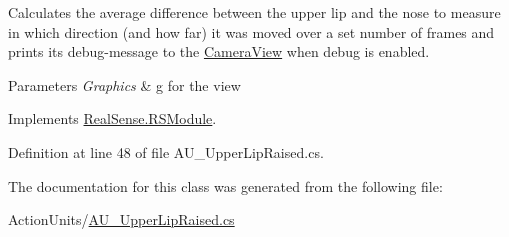 Calculates the average difference between the upper lip and the nose to measure in which direction (and how far) it was moved over a set number of frames and prints its\textquotesingle{} debug-\/message to the \hyperlink{class_real_sense_1_1_camera_view}{Camera\+View} when debug is enabled. 
\begin{DoxyParams}{Parameters}
{\em Graphics} & g for the view \\
\hline
\end{DoxyParams}


Implements \hyperlink{class_real_sense_1_1_r_s_module_a2ec830b7932ee7c0077d473f81c73867}{Real\+Sense.\+R\+S\+Module}.



Definition at line 48 of file A\+U\+\_\+\+Upper\+Lip\+Raised.\+cs.



The documentation for this class was generated from the following file\+:\begin{DoxyCompactItemize}
\item 
Action\+Units/\hyperlink{_a_u___upper_lip_raised_8cs}{A\+U\+\_\+\+Upper\+Lip\+Raised.\+cs}\end{DoxyCompactItemize}
